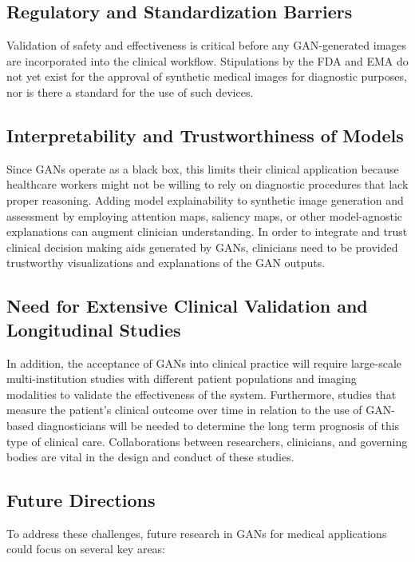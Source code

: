 \documentclass[12pt]{article}
\begin{document}
\subsection{Regulatory and Standardization Barriers}

Validation of safety and effectiveness is critical before any GAN-generated images are incorporated into the clinical workflow. Stipulations by the FDA and EMA do not yet exist for the approval of synthetic medical images for diagnostic purposes, nor is there a standard for the use of such devices.

\subsection{Interpretability and Trustworthiness of Models}

Since GANs operate as a black box, this limits their clinical application because healthcare workers might not be willing to rely on diagnostic procedures that lack proper reasoning. Adding model explainability to synthetic image generation and assessment by employing attention maps, saliency maps, or other model-agnostic explanations can augment clinician understanding. In order to integrate and trust clinical decision making aids generated by GANs, clinicians need to be provided trustworthy visualizations and explanations of the GAN outputs.

\subsection{Need for Extensive Clinical Validation and Longitudinal Studies}

In addition, the acceptance of GANs into clinical practice will require large-scale multi-institution studies with different patient populations and imaging modalities to validate the effectiveness of the system. Furthermore, studies that measure the patient’s clinical outcome over time in relation to the use of GAN-based diagnosticians will be needed to determine the long term prognosis of this type of clinical care. Collaborations between researchers, clinicians, and governing bodies are vital in the design and conduct of these studies.

\subsection{Future Directions}
To address these challenges, future research in GANs for medical applications could focus on several key areas:
\end{document}
